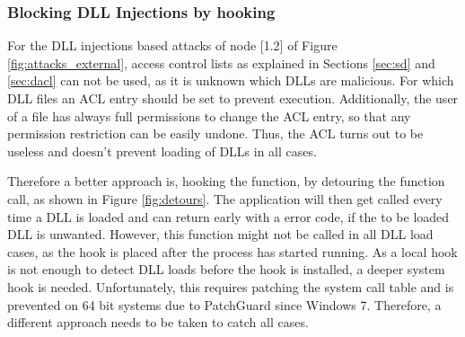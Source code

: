 \subsubsection{Blocking DLL Injections by hooking }
For the DLL injections based attacks of node [1.2] of Figure \ref{fig:attacks_external}, access control lists as explained in Sections \ref{sec:sd} and \ref{sec:dacl} can not be used, as it is unknown which DLLs are malicious. For which DLL files an ACL entry should be set to prevent execution. Additionally, the user of a file has always full permissions to change the ACL entry, so that any permission restriction can be easily undone. Thus, the ACL turns out to be useless and doesn't prevent loading of DLLs in all cases. 

Therefore a better approach is, hooking the  function, by detouring the function call, as shown in Figure \ref{fig:detours}. The application will then get called every time a DLL is loaded and can return early with a  error code, if the to be loaded DLL is unwanted. However, this function might not be called in all DLL load cases, as the hook is placed after the process has started running. As a local hook is not enough to detect DLL loads before the hook is installed, a deeper system hook is needed. Unfortunately, this requires patching the system call table and is prevented on 64 bit systems due to PatchGuard since Windows 7. Therefore, a different approach needs to be taken to catch all cases.